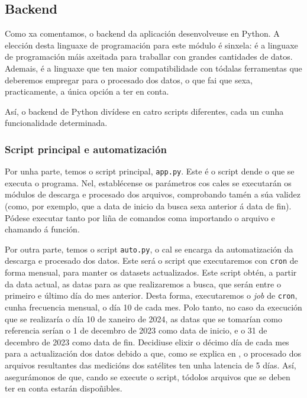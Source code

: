 \subsection{Backend}\label{backend}
Como xa comentamos, o backend da aplicación desenvolveuse en Python. A elección desta linguaxe de programación para este módulo é sinxela: é a linguaxe de programación máis axeitada
para traballar con grandes cantidades de datos. Ademais, é a linguaxe que ten maior compatibilidade con tódalas ferramentas que deberemos empregar para o procesado dos datos, o que
fai que sexa, practicamente, a única opción a ter en conta.

Así, o backend de Python divídese en catro scripts diferentes, cada un cunha funcionalidade determinada.

\subsubsection{Script principal e automatización}\label{app}
Por unha parte, temos o script principal, \texttt{app.py}. Este é o script dende o que se executa o programa. Nel, establécense os parámetros cos cales se executarán os módulos de
descarga e procesado dos arquivos, comprobando tamén a súa validez (como, por exemplo, que a data de inicio da busca sexa anterior á data de fin). Pódese executar tanto por liña de comandos
coma importando o arquivo e chamando á función.

Por outra parte, temos o script \texttt{auto.py}, o cal se encarga da automatización da descarga e procesado dos datos. Este será o script que executaremos con \texttt{cron} de forma mensual,
para manter os datasets actualizados. Este script obtén, a partir da data actual, as datas para as que realizaremos a busca, que serán entre o primeiro e último día do mes anterior. Desta
forma, executaremos o \textit{job} de \texttt{cron}, cunha frecuencia mensual, o día 10 de cada mes. Polo tanto, no caso da execución que se realizaría o día 10 de xaneiro de 2024, as
datas que se tomarían como referencia serían o 1 de decembro de 2023 como data de inicio, e o 31 de decembro de 2023 como data de fin. Decidiuse elixir o décimo día de cada mes para
a actualización dos datos debido a que, como se explica en \cite{s5pdata}, o procesado dos arquivos resultantes das medicións dos satélites ten unha latencia de 5 días. Así, asegurámonos
de que, cando se execute o script, tódolos arquivos que se deben ter en conta estarán dispoñibles.



